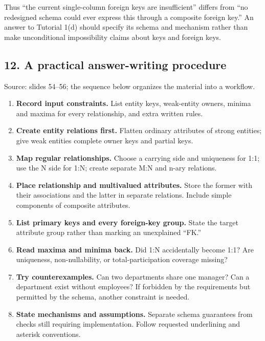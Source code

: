 Thus ``the current single-column foreign keys are insufficient'' differs from ``no redesigned schema could ever express this through a composite foreign key.'' An answer to Tutorial 1(d) should specify its schema and mechanism rather than make unconditional impossibility claims about keys and foreign keys.

\subsection{12. A practical answer-writing procedure}\label{04_er_to_relational_mapping_en-a-practical-answer-writing-procedure}

Source: slides 54--56; the sequence below organizes the material into a workflow.

\begin{enumerate}
\def\labelenumi{\arabic{enumi}.}
\tightlist
\item
  \textbf{Record input constraints.} List entity keys, weak-entity owners, minima and maxima for every relationship, and extra written rules.
\item
  \textbf{Create entity relations first.} Flatten ordinary attributes of strong entities; give weak entities complete owner keys and partial keys.
\item
  \textbf{Map regular relationships.} Choose a carrying side and uniqueness for 1:1; use the N side for 1:N; create separate M:N and n-ary relations.
\item
  \textbf{Place relationship and multivalued attributes.} Store the former with their associations and the latter in separate relations. Include simple components of composite attributes.
\item
  \textbf{List primary keys and every foreign-key group.} State the target attribute group rather than marking an unexplained ``FK.''
\item
  \textbf{Read maxima and minima back.} Did 1:N accidentally become 1:1? Are uniqueness, non-nullability, or total-participation coverage missing?
\item
  \textbf{Try counterexamples.} Can two departments share one manager? Can a department exist without employees? If forbidden by the requirements but permitted by the schema, another constraint is needed.
\item
  \textbf{State mechanisms and assumptions.} Separate schema guarantees from checks still requiring implementation. Follow requested underlining and asterisk conventions.
\end{enumerate}

